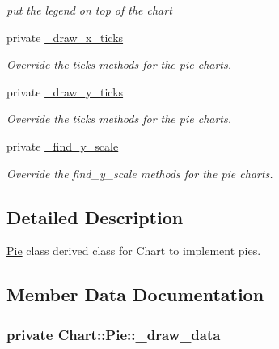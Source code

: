 \begin{DoxyCompactItemize}
\begin{DoxyCompactList}\small\item\em put the legend on top of the chart \item\end{DoxyCompactList}\item 
private \hyperlink{classChart_1_1Pie_ac4809da05e978fb109873de806d75b35}{\_\-draw\_\-x\_\-ticks}
\begin{DoxyCompactList}\small\item\em Override the ticks methods for the pie charts. \item\end{DoxyCompactList}\item 
private \hyperlink{classChart_1_1Pie_adaf9a2d4a6b552f205e3455b61c687cb}{\_\-draw\_\-y\_\-ticks}
\begin{DoxyCompactList}\small\item\em Override the ticks methods for the pie charts. \item\end{DoxyCompactList}\item 
private \hyperlink{classChart_1_1Pie_ae2d77fbce88ae7e1a9e37b8a5cdcb5cb}{\_\-find\_\-y\_\-scale}
\begin{DoxyCompactList}\small\item\em Override the find\_\-y\_\-scale methods for the pie charts. \item\end{DoxyCompactList}\end{DoxyCompactItemize}


\subsection{Detailed Description}
\hyperlink{classChart_1_1Pie}{Pie} class derived class for Chart to implement pies. 

\subsection{Member Data Documentation}
\hypertarget{classChart_1_1Pie_a223df30ed6555878015b643547919911}{
\subsubsection[{\_\-draw\_\-data}]{\setlength{\rightskip}{0pt plus 5cm}private {\bf Chart::Pie::\_\-draw\_\-data}}}
\label{classChart_1_1Pie_a223df30ed6555878015b643547919911}


